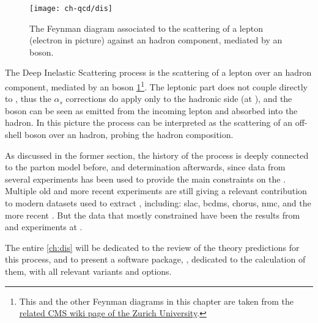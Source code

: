 
\begin{figure}
	\centering
	\texttt{[image: ch-qcd/dis]}
	\caption{
		The \lo Feynman diagram associated to the scattering of a lepton (electron
		in picture) against an hadron component, mediated by an \ew boson.
	}
	\label{fig:qcd/dis}
\end{figure}


The Deep Inelastic Scattering process is the scattering of a lepton over an
hadron component, mediated by an \ew boson \cref{fig:qcd/dis}\footnote{
	This and the other Feynman diagrams in this chapter are taken from the
	\href{https://wiki.physik.uzh.ch/cms/latex:feynman}{related CMS wiki page
		of the Zurich University}.
}.
%
The leptonic part does not couple directly to \qcd , thus the $\alpha_s$
corrections do apply only to the hadronic side (at \lo \ew), and the \ew boson
can be seen as emitted from the incoming lepton and absorbed into the hadron.
%
In this picture the process can be interpreted as the scattering of an
off-shell \ew boson over an hadron, probing the hadron composition.

As discussed in the former section, the history of the \dis process is deeply
connected to the parton model before, and \pdfs determination afterwards,
since data from several \dis experiments has been used to provide the main
constraints on the \pdfs.
%
Multiple old and more recent \dis experiments are still giving a relevant
contribution to modern datasets used to extract \pdfs, including:
\acrfull{slac}, \acrfull{bcdms}, \acrfull{chorus}, \acrfull{nmc}, and the more
recent \nutev.
%
But the \dis data that mostly constrained \pdfs have been the results from
\hone and \zeus experiments at \hera.

The entire \cref{ch:dis} will be dedicated to the review of the theory
predictions for this process, and to present a software package, \yadism,
dedicated to the calculation of them, with all relevant variants and options.

